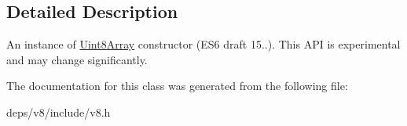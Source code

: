 \subsection{Detailed Description}
An instance of \hyperlink{classv8_1_1_uint8_array}{Uint8\+Array} constructor (E\+S6 draft 15..). This A\+P\+I is experimental and may change significantly. 

The documentation for this class was generated from the following file\+:\begin{DoxyCompactItemize}
\item 
deps/v8/include/v8.\+h\end{DoxyCompactItemize}
